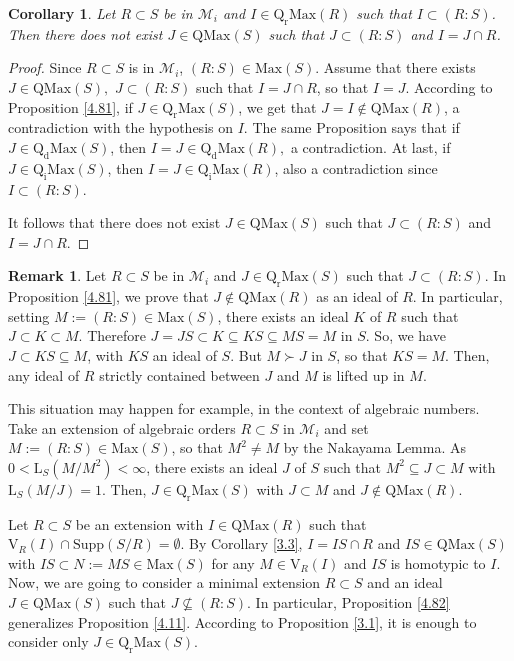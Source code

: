 \documentclass[12pt,leqno]{amsart}
\newtheorem{corollary}[theorem]{Corollary}
\theoremstyle{definition}
\newtheorem{remark}[theorem]{Remark}
\begin{document}
\begin{corollary}\label{4.8} Let $R\subset S$ be in $\mathcal M_i$ and $I\in\mathrm{Q_rMax}(R)$ such that $I\subset (R:S)$. Then there does not exist $J\in\mathrm{QMax}(S)$ such that $J\subset(R:S)$ and $I=J\cap R$. 
\end{corollary}
\begin{proof} Since $R\subset S$ is in $\mathcal M_i$, $(R:S)\in\mathrm {Max}(S)$. Assume that there exists $J\in\mathrm{QMax}(S),$ $J\subset (R:S)$ such that $I=J\cap R$, so that $I=J$. According to Proposition \ref{4.81}, if $J\in\mathrm{Q_rMax}(S)$, we get that $J=I\not\in\mathrm {QMax}(R)$, a contradiction with the hypothesis on $I$. The same Proposition says that if $J\in\mathrm{Q_dMax}(S)$, then $I=J\in\mathrm {Q_dMax}(R),$ a contradiction. At last, if $J\in\mathrm{Q_iMax}(S)$, then $I=J\in\mathrm{Q_iMax}(R)$, also  a contradiction since $I\subset (R:S)$.
 
It follows that there does not exist $J\in\mathrm{QMax}(S)$ such that $J\subset (R:S)$ and  $I= J\cap R$.
\end{proof}

\begin{remark}\label{4.9} Let $R\subset S$ be in $\mathcal M_i$ and $J\in\mathrm{Q_rMax}(S)$ such that $J\subset (R:S)$. In Proposition \ref{4.81}, we prove that $J\not\in\mathrm{QMax}(R)$ as an ideal of $R$. In particular, setting $M:=(R:S)\in\mathrm{Max}(S)$, there exists an ideal $K$ of $R$ such that $J\subset K\subset M$. Therefore $J= JS\subset K\subseteq KS\subseteq MS=M$ in $S$. So, we have $J\subset KS\subseteq M$, with $KS$ an ideal of $S$. But $M\succ J$ in $S$, so that $ KS=M$. Then, any ideal of $R$ strictly contained between $J$ and $M$ is lifted up in $M$. 

This situation may happen for example, in the context of algebraic numbers. Take an extension of algebraic orders $R\subset S$ in $\mathcal M_i$ and set $M:=(R:S)\in\mathrm{Max}(S)$, so that $M^2\neq M$ by the Nakayama Lemma. As $0<\mathrm{L}_S(M/M^2)<\infty$, there exists an ideal $J$ of $S$ such that $M^2\subseteq J\subset M$ with $\mathrm{L}_ S(M/J)=1$. Then, $J\in\mathrm{Q_rMax}(S)$ with $J\subset M$ and $J\not\in\mathrm {QMax}(R)$. 
\end{remark}

Let $R\subset S$ be an extension with $I\in\mathrm{QMax}(R)$ such that $\mathrm{V}_R(I)\cap\mathrm{Supp}(S/R)=\emptyset$. By Corollary \ref{3.3}, $I=IS\cap R$ and $IS\in\mathrm{QMax}(S)$ with $IS\subset N:= MS\in\mathrm{Max}(S)$ for any $M\in\mathrm{V}_R(I)$ and $IS$ is homotypic to $I$. Now, we are going to consider a minimal extension $R\subset S$ and an ideal $J\in\mathrm{QMax}(S)$ such that $J\not\subseteq(R:S)$. In particular, Proposition \ref{4.82} generalizes Proposition \ref{4.11}. According to Proposition \ref{3.1}, it is enough to  consider only $J\in\mathrm{Q_rMax}(S)$.
\end{document}
